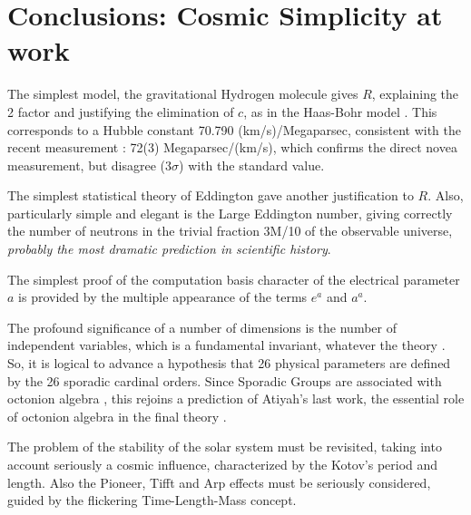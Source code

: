 \documentclass[twoside,draft]{article}
\begin{document}
\begin{sloppypar}
\section {Conclusions: Cosmic Simplicity at work}
The simplest model, the gravitational Hydrogen molecule gives $R$, explaining the 2 factor and
justifying the elimination of $c$, as in the Haas-Bohr model \cite{Sanchez1}. This corresponds to a Hubble constant 70.790
(km/s)/Megaparsec, consistent with the recent measurement \cite{Bonvin}: 72(3) Megaparsec/(km/s), which
confirms the direct novea measurement, but disagree (3$\sigma$) with the standard value.

The simplest statistical theory of Eddington gave another justification to $R$. Also, particularly
simple and elegant is the Large Eddington number, giving correctly the number of neutrons in the
trivial fraction 3M/10 of the observable universe, \textit{probably the most dramatic prediction in
 scientific history}.

The simplest proof of the computation basis character of the electrical parameter $a$ is provided
by the multiple appearance of the terms $e^{a}$ and $a^{a}$.

The profound significance of a number of dimensions is the number of independent variables,
which is a fundamental invariant, whatever the theory \cite{Weigel}. So, it is logical to advance a
hypothesis that 26 physical parameters are defined by the 26 sporadic cardinal orders. Since
Sporadic Groups are associated with octonion algebra \cite{Atiyah2}, this rejoins a prediction of Atiyah's last
work, the essential role of octonion algebra in the final theory \cite{Atiyah1}.

The problem of the stability of the solar system must be revisited, taking into account
seriously a cosmic influence, characterized by the Kotov's period and length. Also the Pioneer, Tifft
and Arp effects must be seriously considered, guided by the flickering Time-Length-Mass concept.


\end{sloppypar}
\end{document}
